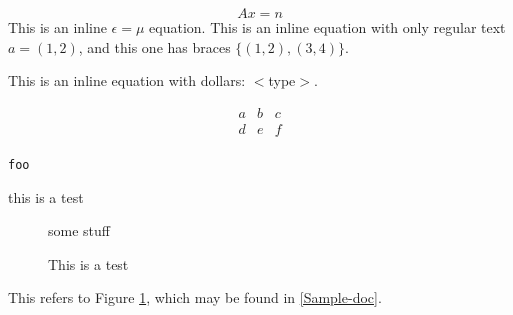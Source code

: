 $$
A x = n
$$
This is an inline $ \epsilon = \mu $ equation.  This is an inline equation
with only regular text $ a = ( 1,2 ) $, and this one has braces $ \{ (1,2),
(3,4)\} $.


This is an inline equation with dollars: {\sf $<$type$>$}.

\begin{eqnarray}
a & b & c \\
d & e & f \\
\end{eqnarray}
\begin{verbatim}
foo
\end{verbatim}
%
this is a test

\begin{figure}
some stuff
\caption{This is a test}\label{fig-foo}
\end{figure}

This refers to Figure \ref{fig-foo}, which may be found in \ref{Sample-doc}.

